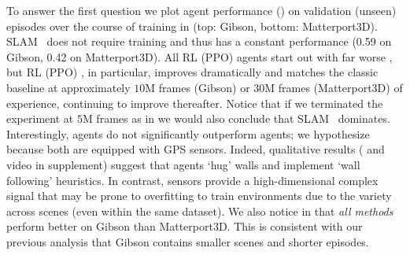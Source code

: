 To answer the first question we plot agent performance 
(\spl) on validation (\ie unseen) episodes over the 
course of training in 
(top: Gibson, bottom: Matterport3D). 
SLAM~\cite{mishkin2019benchmarking} 
does not require training 
and thus has a constant performance (0.59 on Gibson, 0.42 on 
Matterport3D). 
All RL (PPO) agents start out with far worse \spl, 
but RL (PPO) \depth, in particular, improves dramatically 
and matches the classic baseline 
at approximately $10$M frames 
(Gibson) or $30$M frames (Matterport3D)  
of experience, continuing to improve thereafter.  
Notice that if we terminated the experiment at $5$M frames 
as in \cite{mishkin2019benchmarking} we would 
also conclude that SLAM~\cite{mishkin2019benchmarking} dominates. 
Interestingly, 
\rgb agents do not
significantly outperform \blind agents; we hypothesize 
because both 
are equipped with GPS sensors. Indeed, qualitative 
results ( and video in supplement) 
suggest that \blind agents `hug' walls and 
implement `wall following' heuristics.
In contrast, \rgb sensors provide a high-dimensional complex 
signal that may be prone to overfitting to train environments 
due to the variety across scenes (even within the same dataset). 
We also notice in  that \emph{all methods} perform better on Gibson than Matterport3D. 
This is consistent with our previous analysis that Gibson 
contains smaller scenes and shorter episodes. 



